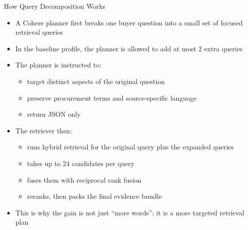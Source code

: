 \documentclass[aspectratio=169]{beamer}
\begin{document}
\begin{frame}{How Query Decomposition Works}
  \begin{itemize}
    \item A Cohere planner first breaks one buyer question into a small set of focused retrieval queries
    \item In the baseline profile, the planner is allowed to add at most 2 extra queries
    \item The planner is instructed to:
      \begin{itemize}
        \item target distinct aspects of the original question
        \item preserve procurement terms and source-specific language
        \item return JSON only
      \end{itemize}
    \item The retriever then:
      \begin{itemize}
        \item runs hybrid retrieval for the original query plus the expanded queries
        \item takes up to 24 candidates per query
        \item fuses them with reciprocal rank fusion
        \item reranks, then packs the final evidence bundle
      \end{itemize}
    \item This is why the gain is not just “more words”; it is a more targeted retrieval plan
  \end{itemize}
\end{frame}
\end{document}
